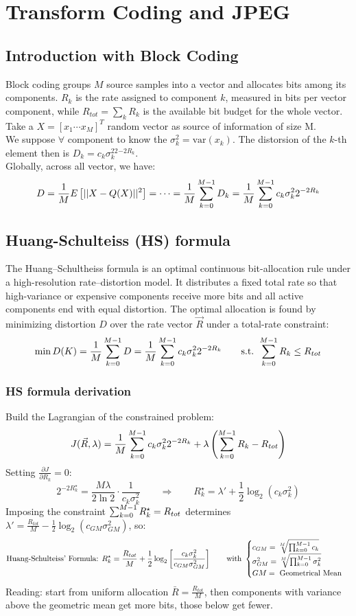 \section{Transform Coding and JPEG}
\subsection{Introduction with Block Coding}
Block coding groups $M$ source samples into a vector and allocates bits among its components. $R_k$ is the rate assigned to component $k$, measured in bits per vector component, while $R_{tot}=\sum_k R_k$ is the available bit budget for the whole vector.
Take a $X = [x_1 \cdots x_M]^T$ random vector as source of information of size M.\\
We suppose $\forall$ component to know the $\sigma^2_k = \text{var}(x_k)$. The distorsion of the $k$-th element then is $D_k = c_k\sigma_k^22^{-2R_k}$.\\
Globally, across all vector, we have:
$$D = \frac{1}{M}E\left[||X-Q(X)||^2\right] = \dots = \frac{1}{M}\sr{M-1}{k=0}D_k = \frac{1}{M}\sr{M-1}{k=0}c_k\sigma_k^22^{-2R_k}$$
\subsection{Huang-Schulteiss (HS) formula}
The Huang--Schultheiss formula is an optimal continuous bit-allocation rule under a high-resolution rate--distortion model. It distributes a fixed total rate so that high-variance or expensive components receive more bits and all active components end with equal distortion.
The optimal allocation is found by minimizing distortion $D$ over the rate vector $\vec{R}$ under a total-rate constraint:
$$\min D(K) = \frac{1}{M}\sr{M-1}{k=0}D = \frac{1}{M}\sr{M-1}{k=0}c_k\sigma^2_k2^{-2R_k} \qquad \text{s.t. }\sr{M-1}{k=0}R_k \leq R_{tot}$$
\subsubsection{HS formula derivation}
Build the Lagrangian of the constrained problem:
$$J(\vec{R},\lambda) = \frac{1}{M}\sr{M-1}{k=0}c_k\sigma_k^22^{-2R_k} + \lambda\left(\sr{M-1}{k=0}R_k - R_{tot}\right)$$
Setting $\frac{\partial J}{\partial R_k} = 0$:
$$2^{-2R_k^\star} = \frac{M\lambda}{2\ln 2}\cdot\frac{1}{c_k\sigma_k^2} \qquad \Longrightarrow \qquad R_k^\star = \lambda' + \frac{1}{2}\log_2\left(c_k\sigma_k^2\right)$$
Imposing the constraint $\sr{M-1}{k=0}R_k^\star = R_{tot}$ determines $\lambda' = \frac{R_{tot}}{M} - \frac{1}{2}\log_2\left(c_{GM}\sigma^2_{GM}\right)$, so:
$$\text{Huang-Schulteiss' Formula: }R_k^{\star} = \frac{R_{tot}}{M} + \frac{1}{2}\log_2\left[\frac{c_k\sigma^2_k}{c_{GM}\sigma^2_{GM}}\right] \qquad \text{with }\begin{cases}
    c_{GM}=\sqrt[M]{\pr{M-1}{k=0}c_k}\\
    \sigma^2_{GM}=\sqrt[M]{\pr{M-1}{k=0}\sigma^2_k}\\
    GM = \text{ Geometrical Mean}
\end{cases}$$
Reading: start from uniform allocation $\bar{R} = \frac{R_{tot}}{M}$, then components with variance above the geometric mean get more bits, those below get fewer.
